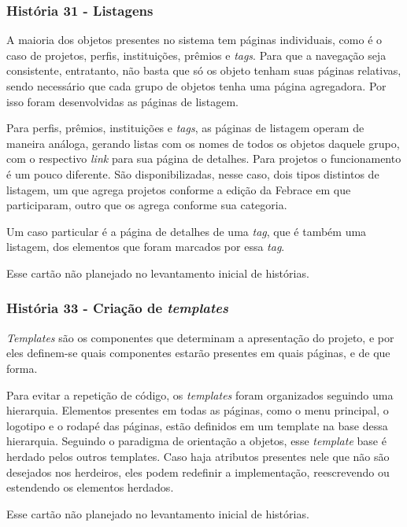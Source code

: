     \subsubsection{História 31 - Listagens}
      A maioria dos objetos presentes no sistema tem páginas individuais, como é o caso de projetos, perfis, instituições, prêmios e \textit{tags}. Para que a navegação seja consistente, entratanto, não basta que só os objeto tenham suas páginas relativas, sendo necessário que cada grupo de objetos tenha uma página agregadora. Por isso foram desenvolvidas as páginas de listagem.

      Para perfis, prêmios, instituições e \textit{tags}, as páginas de listagem operam de maneira análoga, gerando listas com os nomes de todos os objetos daquele grupo, com o respectivo \textit{link} para sua página de detalhes. Para projetos o funcionamento é um pouco diferente. São disponibilizadas, nesse caso, dois tipos distintos de listagem, um que agrega projetos conforme a edição da Febrace em que participaram, outro que os agrega conforme sua categoria.

      Um caso particular é a página de detalhes de uma \textit{tag}, que é também uma listagem, dos elementos que foram marcados por essa \textit{tag}.

  Esse cartão não planejado no levantamento inicial de histórias.

    \subsubsection{História 33 - Criação de \textit{templates}}
      \textit{Templates} são os componentes que determinam a apresentação do projeto, e por eles definem-se quais componentes estarão presentes em quais páginas, e de que forma.

      Para evitar a repetição de código, os \textit{templates} foram organizados seguindo uma hierarquia. Elementos presentes em todas as páginas, como o menu principal, o logotipo e o rodapé das páginas, estão definidos em um template na base dessa hierarquia. Seguindo o paradigma de orientação a objetos, esse \textit{template} base é herdado pelos outros templates. Caso haja atributos presentes nele que não são desejados nos herdeiros, eles podem redefinir a implementação, reescrevendo ou estendendo os elementos herdados.

  Esse cartão não planejado no levantamento inicial de histórias.

